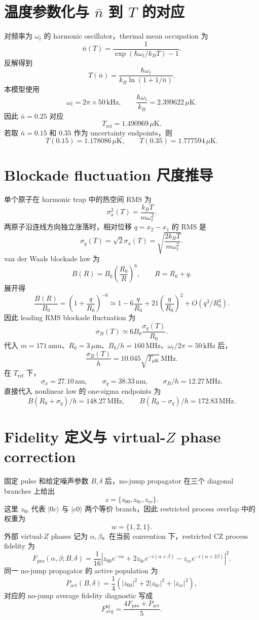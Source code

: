 \documentclass[UTF8,11pt]{ctexart}
\numberwithin{equation}{section}
\begin{document}
\section{温度参数化与 \texorpdfstring{\(\bar n\)}{nbar} 到 \texorpdfstring{\(T\)}{T} 的对应}
\label{app:nbar-temperature}

对频率为 \(\omega_t\) 的 harmonic oscillator，thermal mean occupation 为
\[
\bar n(T)=\frac{1}{\exp(\hbar\omega_t/k_B T)-1}.
\]
反解得到
\[
T(\bar n)=\frac{\hbar\omega_t}{k_B\ln(1+1/\bar n)}.
\]
本模型使用
\[
\omega_t=2\pi\times50\,\mathrm{kHz},
\qquad
\frac{\hbar\omega_t}{k_B}=2.399622\,\mu\mathrm{K}.
\]
因此 \(\bar n=0.25\) 对应
\[
T_\mathrm{ref}=1.490969\,\mu\mathrm{K}.
\]
若取 \(\bar n=0.15\) 和 \(0.35\) 作为 uncertainty endpoints，则
\[
T(0.15)=1.178086\,\mu\mathrm{K},
\qquad
T(0.35)=1.777594\,\mu\mathrm{K}.
\]

\section{Blockade fluctuation 尺度推导}
\label{app:blockade-scale}

单个原子在 harmonic trap 中的热空间 RMS 为
\[
\sigma_x^2(T)=\frac{k_B T}{m\omega_t^2}.
\]
两原子沿连线方向独立涨落时，相对位移 \(q=x_2-x_1\) 的 RMS 是
\[
\sigma_q(T)=\sqrt{2}\sigma_x(T)
=\sqrt{\frac{2k_B T}{m\omega_t^2}}.
\]
van der Waals blockade law 为
\[
B(R)=B_0\left(\frac{R_0}{R}\right)^6,
\qquad
R=R_0+q.
\]
展开得
\[
\frac{B(R)}{B_0}=\left(1+\frac{q}{R_0}\right)^{-6}
\simeq 1-6\frac{q}{R_0}+21\left(\frac{q}{R_0}\right)^2+O(q^3/R_0^3).
\]
因此 leading RMS blockade fluctuation 为
\[
\sigma_B(T)\simeq 6B_0\frac{\sigma_q(T)}{R_0}.
\]
代入 \(m=171\,\mathrm{amu}\)、\(R_0=3\,\mu\mathrm{m}\)、\(B_0/h=160\,\mathrm{MHz}\)、\(\omega_t/2\pi=50\,\mathrm{kHz}\) 后，
\[
\boxed{\frac{\sigma_B(T)}{h}=10.045\sqrt{T_{\mu\mathrm{K}}}\,\mathrm{MHz}}.
\]
在 \(T_\mathrm{ref}\) 下，
\[
\sigma_x=27.10\,\mathrm{nm},\qquad
\sigma_q=38.33\,\mathrm{nm},\qquad
\sigma_B/h=12.27\,\mathrm{MHz}.
\]
直接代入 nonlinear law 的 one-sigma endpoints 为
\[
B(R_0+\sigma_q)/h=148.27\,\mathrm{MHz},
\qquad
B(R_0-\sigma_q)/h=172.83\,\mathrm{MHz}.
\]

\section{Fidelity 定义与 virtual-\texorpdfstring{\(Z\)}{Z} phase correction}
\label{app:fidelity-definition}

固定 pulse 和给定噪声参数 \(B,\delta\) 后，no-jump propagator 在三个 diagonal branches 上给出
\[
z=\{z_{00},z_{0c},z_{cc}\}.
\]
这里 \(z_{0c}\) 代表 \(|0c\rangle\) 与 \(|c0\rangle\) 两个等价 branch，因此 restricted process overlap 中的权重为
\[
w=\{1,2,1\}.
\]
外部 virtual-\(Z\) phases 记为 \(\alpha,\beta\)。在当前 convention 下，restricted CZ process fidelity 为
\[
F_\mathrm{pro}(\alpha,\beta;B,\delta)
=\frac{1}{16}\left|
z_{00}e^{-i\alpha}
+2z_{0c}e^{-i(\alpha+\beta)}
-z_{cc}e^{-i(\alpha+2\beta)}
\right|^2.
\]
同一 no-jump propagator 的 active population 为
\[
P_\mathrm{act}(B,\delta)
=\frac{1}{4}\left(
|z_{00}|^2+2|z_{0c}|^2+|z_{cc}|^2
\right),
\]
对应的 no-jump average fidelity diagnostic 写成
\[
F_\mathrm{avg}^\mathrm{nj}
=\frac{4F_\mathrm{pro}+P_\mathrm{act}}{5}.
\]
\end{document}
